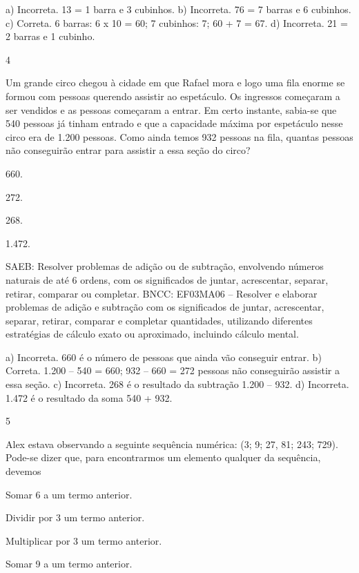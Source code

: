 \begin{multicols}{2}
{\begin{escolha}
{a) Incorreta. 13 = 1 barra e 3 cubinhos.
b) Incorreta. 76 = 7 barras e 6 cubinhos.
c) Correta. 6 barras: 6 x 10 = 60; 7 cubinhos: 7; 60 + 7 = 67.
d) Incorreta. 21 = 2 barras e 1 cubinho.

\num{4}

Um grande circo chegou à cidade em que Rafael mora e logo uma fila enorme se formou com pessoas querendo assistir ao espetáculo. Os ingressos começaram a ser vendidos e as pessoas começaram a entrar. Em certo instante, sabia-se que 540 pessoas já tinham entrado e que a capacidade máxima por espetáculo nesse circo era de 1.200 pessoas. Como ainda temos 932 pessoas na fila, quantas pessoas não conseguirão entrar para assistir a essa seção do circo?

\begin{escolha}
\item
  660.
\item
  272.
\item
  268.
\item
  1.472.
\end{escolha}

SAEB: Resolver problemas de adição ou de subtração,
envolvendo números naturais de até 6 ordens, com os significados de
juntar, acrescentar, separar, retirar, comparar ou completar.
BNCC: EF03MA06 – Resolver e elaborar problemas de adição e subtração com os significados de
juntar, acrescentar, separar, retirar, comparar e completar quantidades, utilizando diferentes
estratégias de cálculo exato ou aproximado, incluindo cálculo mental.


a) Incorreta. 660 é o número de pessoas que ainda vão conseguir entrar.
b) Correta. 1.200 -- 540 = 660; 932 -- 660 = 272 pessoas não conseguirão assistir a essa seção.
c) Incorreta. 268 é o resultado da subtração 1.200 -- 932.
d) Incorreta. 1.472 é o resultado da soma 540 + 932.

\num{5}

Alex estava observando a seguinte sequência numérica: (3; 9; 27, 81; 243; 729).
Pode-se dizer que, para encontrarmos um elemento qualquer da sequência, devemos 

\begin{escolha}
\item
  Somar 6 a um termo anterior.
\item
  Dividir por 3 um termo anterior.
\item
  Multiplicar por 3 um termo anterior.
\item
  Somar 9 a um termo anterior.
\end{escolha}

}
\end{escolha}}
\end{multicols}
